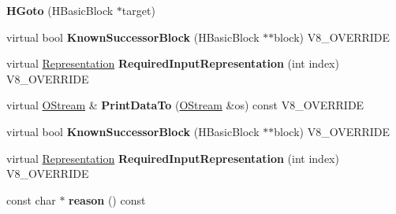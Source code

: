 \begin{DoxyCompactItemize}
\item 
\hypertarget{classv8_1_1internal_1_1_v8___f_i_n_a_l_aeac1461af267a9d75ff503a3d6831605}{}{\bfseries H\+Goto} (H\+Basic\+Block $\ast$target)\label{classv8_1_1internal_1_1_v8___f_i_n_a_l_aeac1461af267a9d75ff503a3d6831605}

\item 
\hypertarget{classv8_1_1internal_1_1_v8___f_i_n_a_l_a85ba341b22db01ee3cd7145d9f8e9b99}{}virtual bool {\bfseries Known\+Successor\+Block} (H\+Basic\+Block $\ast$$\ast$block) V8\+\_\+\+O\+V\+E\+R\+R\+I\+D\+E\label{classv8_1_1internal_1_1_v8___f_i_n_a_l_a85ba341b22db01ee3cd7145d9f8e9b99}

\item 
\hypertarget{classv8_1_1internal_1_1_v8___f_i_n_a_l_a6c6d1f37f40b113d8f4062f1ffff7215}{}virtual \hyperlink{classv8_1_1internal_1_1_representation}{Representation} {\bfseries Required\+Input\+Representation} (int index) V8\+\_\+\+O\+V\+E\+R\+R\+I\+D\+E\label{classv8_1_1internal_1_1_v8___f_i_n_a_l_a6c6d1f37f40b113d8f4062f1ffff7215}

\item 
\hypertarget{classv8_1_1internal_1_1_v8___f_i_n_a_l_ac450dad970b14246be761ccf5004924b}{}virtual \hyperlink{classv8_1_1internal_1_1_o_stream}{O\+Stream} \& {\bfseries Print\+Data\+To} (\hyperlink{classv8_1_1internal_1_1_o_stream}{O\+Stream} \&os) const V8\+\_\+\+O\+V\+E\+R\+R\+I\+D\+E\label{classv8_1_1internal_1_1_v8___f_i_n_a_l_ac450dad970b14246be761ccf5004924b}

\item 
\hypertarget{classv8_1_1internal_1_1_v8___f_i_n_a_l_a85ba341b22db01ee3cd7145d9f8e9b99}{}virtual bool {\bfseries Known\+Successor\+Block} (H\+Basic\+Block $\ast$$\ast$block) V8\+\_\+\+O\+V\+E\+R\+R\+I\+D\+E\label{classv8_1_1internal_1_1_v8___f_i_n_a_l_a85ba341b22db01ee3cd7145d9f8e9b99}

\item 
\hypertarget{classv8_1_1internal_1_1_v8___f_i_n_a_l_a6c6d1f37f40b113d8f4062f1ffff7215}{}virtual \hyperlink{classv8_1_1internal_1_1_representation}{Representation} {\bfseries Required\+Input\+Representation} (int index) V8\+\_\+\+O\+V\+E\+R\+R\+I\+D\+E\label{classv8_1_1internal_1_1_v8___f_i_n_a_l_a6c6d1f37f40b113d8f4062f1ffff7215}

\item 
\hypertarget{classv8_1_1internal_1_1_v8___f_i_n_a_l_af70e6fc5e3e2bf9a3c8276ccc97eb492}{}const char $\ast$ {\bfseries reason} () const \label{classv8_1_1internal_1_1_v8___f_i_n_a_l_af70e6fc5e3e2bf9a3c8276ccc97eb492}


\end{DoxyCompactItemize}

